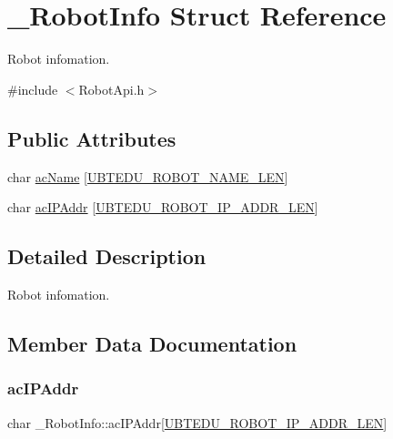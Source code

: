 \hypertarget{struct__RobotInfo}{}\section{\+\_\+\+Robot\+Info Struct Reference}
\label{struct__RobotInfo}


Robot infomation.  




{\ttfamily \#include $<$Robot\+Api.\+h$>$}

\subsection*{Public Attributes}
\begin{DoxyCompactItemize}
\item 
char \hyperlink{struct__RobotInfo_a0dc600adfbf72150e776f100d6ec80ad}{ac\+Name} \mbox{[}\hyperlink{RobotApi_8h_aa37c5da3aea28e1d6eb93c3950ac7afe}{U\+B\+T\+E\+D\+U\+\_\+\+R\+O\+B\+O\+T\+\_\+\+N\+A\+M\+E\+\_\+\+L\+EN}\mbox{]}
\item 
char \hyperlink{struct__RobotInfo_aca220e4bd42b444cc5f105c4ceaf2760}{ac\+I\+P\+Addr} \mbox{[}\hyperlink{RobotApi_8h_ab92db2df9ca7c3c48ff6495f9bafc53d}{U\+B\+T\+E\+D\+U\+\_\+\+R\+O\+B\+O\+T\+\_\+\+I\+P\+\_\+\+A\+D\+D\+R\+\_\+\+L\+EN}\mbox{]}
\end{DoxyCompactItemize}


\subsection{Detailed Description}
Robot infomation. 

\subsection{Member Data Documentation}
\mbox{\label{struct__RobotInfo_aca220e4bd42b444cc5f105c4ceaf2760}} 
\subsubsection{\texorpdfstring{ac\+I\+P\+Addr}{acIPAddr}}
{\footnotesize\ttfamily char \+\_\+\+Robot\+Info\+::ac\+I\+P\+Addr\mbox{[}\hyperlink{RobotApi_8h_ab92db2df9ca7c3c48ff6495f9bafc53d}{U\+B\+T\+E\+D\+U\+\_\+\+R\+O\+B\+O\+T\+\_\+\+I\+P\+\_\+\+A\+D\+D\+R\+\_\+\+L\+EN}\mbox{]}}

